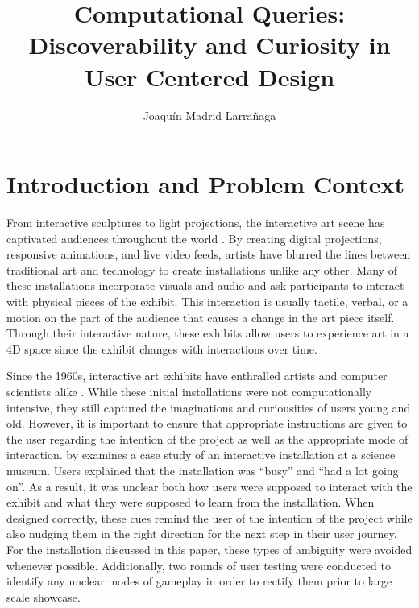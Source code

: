 \documentclass[10pt,twocolumn]{article}
\title{Computational Queries: Discoverability and Curiosity in User Centered Design}
\author{Joaquín Madrid Larrañaga}
\affiliation{Occidental College}
\begin{document}
\maketitle

\section{Introduction and Problem Context}
From interactive sculptures to light projections, the interactive art scene has captivated audiences throughout the world \cite{sarto_disneys_2021, noauthor_teamlab_2020}.  By creating digital projections, responsive animations, and live video feeds, artists have blurred the lines between traditional art and technology to create installations unlike any other.  Many of these installations incorporate visuals and audio and ask participants to interact with physical pieces of the exhibit. This interaction is usually tactile, verbal, or a motion on the part of the audience that causes a change in the art piece itself.  Through their interactive nature, these exhibits allow users to experience art in a 4D space since the exhibit changes with interactions over time. 

Since the 1960s, interactive art exhibits have enthralled artists and computer scientists alike \cite{trifonova_software_2008}.  While these initial installations were not computationally intensive, they still captured the imaginations and curiousities of users young and old.  However, it is important to ensure that appropriate instructions are given to the user regarding the intention of the project as well as the appropriate mode of interaction.  by \citeauthor{hornecker_x201ci_2008} examines a case study of an interactive installation at a science museum.  Users explained that the installation was ``busy'' and ``had a lot going on''.  As a result, it was unclear both how users were supposed to interact with the exhibit and what they were supposed to learn from the installation. When designed correctly, these cues remind the user of the intention of the project while also nudging them in the right direction for the next step in their user journey.  For the installation discussed in this paper, these types of ambiguity were avoided whenever possible. Additionally, two rounds of user testing were conducted to identify any unclear modes of gameplay in order to rectify them prior to large scale showcase. 
\end{document}
